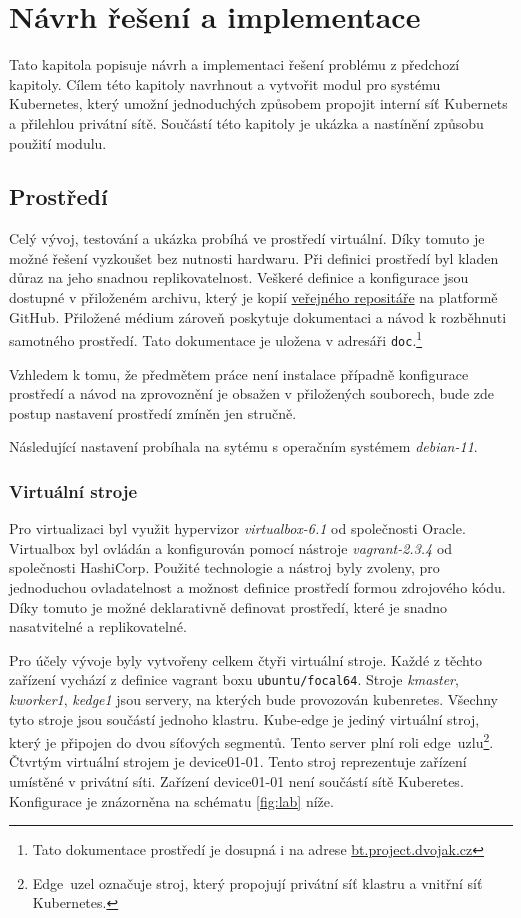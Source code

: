 \chapter{Návrh řešení a implementace}
\begin{chapterabstract}
Tato kapitola popisuje návrh a implementaci řešení problému z předchozí kapitoly. Cílem této kapitoly navrhnout a vytvořit modul pro systému Kubernetes, který umožní jednoduchých způsobem propojit interní síť Kubernets a přilehlou privátní sítě. Součástí této kapitoly je ukázka a nastínění způsobu použití modulu.
\end{chapterabstract}

\section{Prostředí}\label{prostredi}
Celý vývoj, testování a ukázka probíhá ve prostředí virtuální. Díky tomuto je možné řešení vyzkoušet bez nutnosti hardwaru. Při definici prostředí byl kladen důraz na jeho snadnou replikovatelnost. Veškeré definice a konfigurace jsou dostupné v přiloženém archivu, který je kopií \href{veřejného repozitáře}{veřejného repositáře} na platformě GitHub. Přiložené médium zároveň poskytuje dokumentaci a návod k rozběhnuti samotného prostředí. Tato dokumentace je uložena v adresáři \verb|doc|.\footnote{Tato dokumentace prostředí je dosupná i na adrese \href{https://bt.project.dvojak.cz/}{bt.project.dvojak.cz}}

Vzhledem k tomu, že předmětem práce není instalace případně konfigurace prostředí a návod na zprovoznění je obsažen v přiložených souborech, bude zde postup nastavení prostředí zmíněn jen stručně.

Následující nastavení probíhala na sytému s operačním systémem \textit{debian-11}.
\subsection{Virtuální stroje}
 Pro virtualizaci byl využit hypervizor \textit{virtualbox-6.1} od společnosti Oracle. Virtualbox byl ovládán a konfigurován pomocí nástroje \textit{vagrant-2.3.4} od společnosti HashiCorp. Použité technologie a nástroj byly zvoleny, pro jednoduchou ovladatelnost a možnost definice prostředí formou zdrojového kódu. Díky tomuto je možné deklarativně definovat prostředí, které je snadno nasatvitelné a replikovatelné. 

Pro účely vývoje byly vytvořeny celkem čtyři virtuální stroje. Každé z těchto zařízení vychází z definice vagrant boxu \verb|ubuntu/focal64|. Stroje \textit{kmaster}, \textit{kworker1}, \textit{kedge1} jsou servery, na kterých bude provozován kubenretes. Všechny tyto stroje jsou součástí jednoho klastru. Kube-edge je jediný virtuální stroj, který je připojen do dvou síťových segmentů. Tento server plní roli edge~uzlu\footnote{Edge~uzel označuje stroj, který propojují privátní síť klastru a vnitřní síť Kubernetes.}. Čtvrtým virtuální strojem je device01-01. Tento stroj reprezentuje zařízení umístěné v privátní síti. Zařízení device01-01 není součástí sítě Kuberetes. Konfigurace je znázorněna na schématu \ref{fig:lab} níže.

